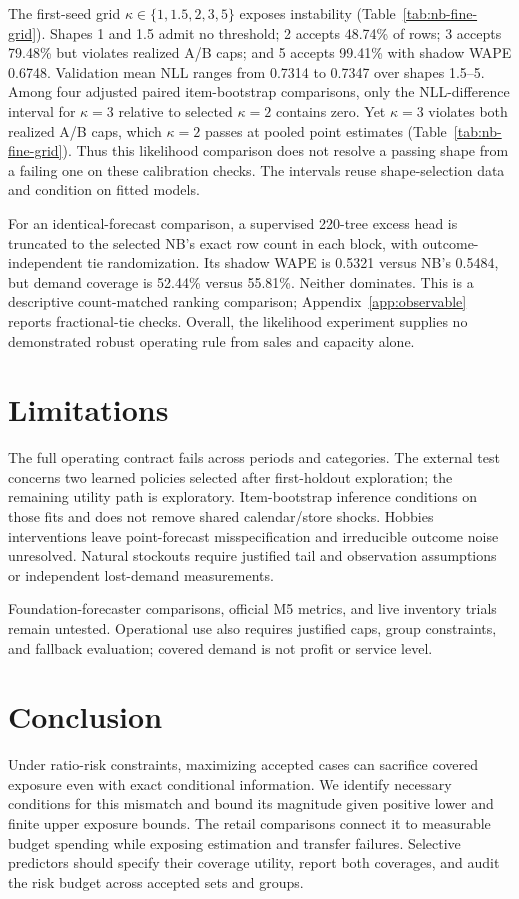 \documentclass{article}
\begin{document}
The first-seed grid $\kappa\in\{1,1.5,2,3,5\}$ exposes instability (Table~\ref{tab:nb-fine-grid}). Shapes 1 and 1.5 admit no threshold; 2 accepts 48.74\% of rows; 3 accepts 79.48\% but violates realized A/B caps; and 5 accepts 99.41\% with shadow WAPE 0.6748. Validation mean NLL ranges from 0.7314 to 0.7347 over shapes 1.5--5. Among four adjusted paired item-bootstrap comparisons, only the NLL-difference interval for $\kappa=3$ relative to selected $\kappa=2$ contains zero. Yet $\kappa=3$ violates both realized A/B caps, which $\kappa=2$ passes at pooled point estimates (Table~\ref{tab:nb-fine-grid}). Thus this likelihood comparison does not resolve a passing shape from a failing one on these calibration checks. The intervals reuse shape-selection data and condition on fitted models.

For an identical-forecast comparison, a supervised 220-tree excess head is truncated to the selected NB's exact row count in each block, with outcome-independent tie randomization. Its shadow WAPE is 0.5321 versus NB's 0.5484, but demand coverage is 52.44\% versus 55.81\%. Neither dominates. This is a descriptive count-matched ranking comparison; Appendix~\ref{app:observable} reports fractional-tie checks. Overall, the likelihood experiment supplies no demonstrated robust operating rule from sales and capacity alone.

\FloatBarrier

\section{Limitations}
The full operating contract fails across periods and categories. The external test concerns two learned policies selected after first-holdout exploration; the remaining utility path is exploratory. Item-bootstrap inference conditions on those fits and does not remove shared calendar/store shocks. Hobbies interventions leave point-forecast misspecification and irreducible outcome noise unresolved. Natural stockouts require justified tail and observation assumptions or independent lost-demand measurements.

Foundation-forecaster comparisons, official M5 metrics, and live inventory trials remain untested. Operational use also requires justified caps, group constraints, and fallback evaluation; covered demand is not profit or service level.

\section{Conclusion}
Under ratio-risk constraints, maximizing accepted cases can sacrifice covered exposure even with exact conditional information. We identify necessary conditions for this mismatch and bound its magnitude given positive lower and finite upper exposure bounds. The retail comparisons connect it to measurable budget spending while exposing estimation and transfer failures. Selective predictors should specify their coverage utility, report both coverages, and audit the risk budget across accepted sets and groups.
\end{document}
